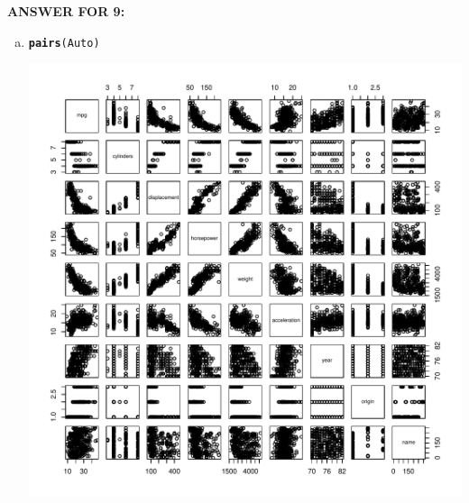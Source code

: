 \documentclass{article}\usepackage[]{graphicx}\usepackage[]{color}
\makeatletter
\def\maxwidth{ %
  \ifdim\Gin@nat@width>\linewidth
    \linewidth
  \else
    \Gin@nat@width
  \fi
}
\newcommand{\hlstd}[1]{\textcolor[rgb]{0.345,0.345,0.345}{#1}}%
\newcommand{\hlkwd}[1]{\textcolor[rgb]{0.737,0.353,0.396}{\textbf{#1}}}%
\newenvironment{kframe}{%
 \def\at@end@of@kframe{}%
 \ifinner\ifhmode%
  \def\at@end@of@kframe{\end{minipage}}%
  \begin{minipage}{\columnwidth}%
 \fi\fi%
 \def\FrameCommand##1{\hskip\@totalleftmargin \hskip-\fboxsep
 \colorbox{shadecolor}{##1}\hskip-\fboxsep
     \hskip-\linewidth \hskip-\@totalleftmargin \hskip\columnwidth}%
 \MakeFramed {\advance\hsize-\width
   \@totalleftmargin\z@ \linewidth\hsize
   \@setminipage}}%
 {\par\unskip\endMakeFramed%
 \at@end@of@kframe}
\newenvironment{knitrout}{}{} %
\makeatother
\begin{document}
\textbf{ANSWER FOR 9:} \\
\begin{enumerate}[(a)]

\item
\begin{knitrout}
\color{fgcolor}\begin{kframe}
\begin{alltt}
\hlkwd{pairs}\hlstd{(Auto)}
\end{alltt}
\end{kframe}
\includegraphics[width=\maxwidth]{figure/unnamed-chunk-10-1} 

\end{knitrout}


\end{enumerate}
\end{document}
